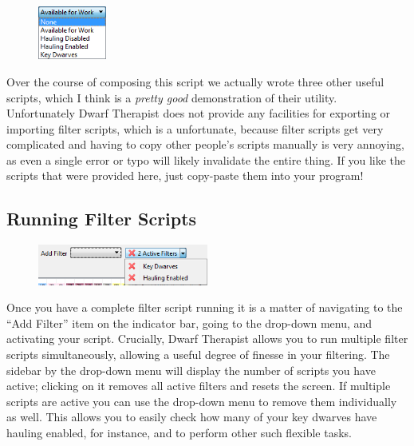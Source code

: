 \documentclass[]{article}
\begin{document}
\newpage
\begin{figure}
\vspace{-5pt}
  \begin{center}
    \includegraphics[width=0.2\textwidth]{Sec4Fig4}
  \end{center}
\vspace{-15pt}
\end{figure}
Over the course of composing this script we actually wrote three other useful scripts, which I think is a
\emph{pretty good} demonstration of their utility. Unfortunately Dwarf
Therapist does not provide any facilities for exporting or importing filter scripts, which is a
unfortunate, because filter scripts get very complicated and having to copy other people's scripts
manually is very annoying, as even a single error or typo will likely invalidate the entire thing.
If you like the scripts that were provided here, just copy-paste them into your program!

\subsection{Running Filter Scripts}
\label{sec:Running Filter Scripts}
\begin{figure}
  \begin{center}
  \vspace{-20pt}
    \includegraphics[width=0.5\textwidth]{Sec4Fig4+}
  \vspace{-20pt}
  \end{center}
\end{figure}

Once you have a complete filter script running it is a matter of navigating to the ``Add Filter'' item
on the indicator bar, going to the drop-down menu, and activating your script. Crucially, Dwarf
Therapist allows you to run multiple filter scripts simultaneously, allowing a useful degree of finesse
in your filtering. The sidebar by the drop-down menu will display the number of scripts you have active;
clicking on it removes all active filters and resets the screen. If multiple scripts are active you can
use the drop-down menu to remove them individually as well. This allows you to easily check
how many of your key dwarves have hauling enabled, for instance, and to perform other such flexible
tasks.
\end{document}
